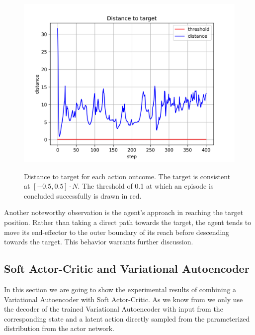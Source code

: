 \begin{figure}[h]
\begin{center}
{        \includegraphics[width=0.31 \linewidth]{figures/experiments/Distance_to_target_baseline_20_1691619159_5000.png}
            \label{fig:SAC_baseline_inference/distance_20}
            }
    \end{center}
    \caption[SAC baseline inference]{Distance to target for each action outcome. The target is consistent at $[-0.5, 0.5] \cdot N$. The threshold of 0.1 at which an episode is concluded successfully is drawn in red.} 
    \label{fig:SAC_baseline_inference_distance}
\end{figure}
Another noteworthy observation is the agent's approach in reaching the target position. Rather than taking a direct path towards the target, the agent tends to move its end-effector to the outer boundary of its reach before descending towards the target. This behavior warrants further discussion.

\subsection{Soft Actor-Critic and Variational Autoencoder}

In this section we are going to show the experimental results of combining a Variational Autoencoder with Soft Actor-Critic. As we know from  we only use the decoder of the trained Variational Autoencoder with input from the corresponding state and a latent action directly sampled from the parameterized distribution from the actor network.

